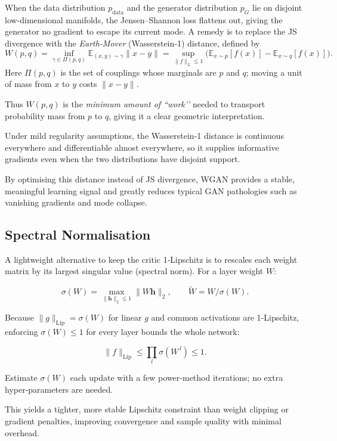 \documentclass{article}
\begin{document}
When the data distribution \(p_{\mathrm{data}}\) and the generator distribution \(p_G\) lie on disjoint low‑dimensional manifolds, the Jensen–Shannon loss flattens out, giving the generator no gradient to escape its current mode.  
A remedy is to replace the JS divergence with the \emph{Earth‑Mover} (Wasserstein‑1) distance, defined by
\[
  W(p,q)=\inf_{\gamma\in\Pi(p,q)}
           \mathbb{E}_{(x,y)\sim\gamma}\|x-y\|
        =\sup_{\|f\|_{L}\le1}
           \bigl(\mathbb{E}_{x\sim p}[f(x)]
                -\mathbb{E}_{x\sim q}[f(x)]\bigr).
\]
Here \(\Pi(p,q)\) is the set of couplings whose marginals are \(p\) and \(q\); moving a unit of mass from \(x\) to \(y\) costs \(\|x-y\|\).  

Thus \(W(p,q)\) is the \emph{minimum amount of “work’’} needed to transport probability mass from \(p\) to \(q\), giving it a clear geometric interpretation.

Under mild regularity assumptions, the Wasserstein‑1 distance is continuous everywhere and differentiable almost everywhere, so it supplies informative gradients even when the two distributions have disjoint support.

By optimising this distance instead of JS divergence, WGAN provides a stable, meaningful learning signal and greatly reduces typical GAN pathologies such as vanishing gradients and mode collapse.

\subsection{Spectral Normalisation}
A lightweight alternative to keep the critic 1‑Lipschitz is to rescales each weight matrix by its largest singular value (spectral norm). For a layer weight \(W\):

\[
\sigma(W)=\max_{\|\mathbf{h}\|_2\le1}\|W\mathbf{h}\|_2,\qquad 
\widetilde{W}=W/\sigma(W).
\]

Because \(\|g\|_{\mathrm{Lip}}=\sigma(W)\) for linear \(g\) and common activations are 1‑Lipschitz, enforcing \(\sigma(W)\le1\) for every layer bounds the whole network:

\[
\|f\|_{\mathrm{Lip}}\le\prod_{l}\sigma(W^{\,l})\le1.
\]

Estimate \(\sigma(W)\) each update with a few power‑method iterations; no extra hyper‑parameters are needed.

This yields a tighter, more stable Lipschitz constraint than weight clipping or gradient penalties, improving convergence and sample quality with minimal overhead.
\end{document}
